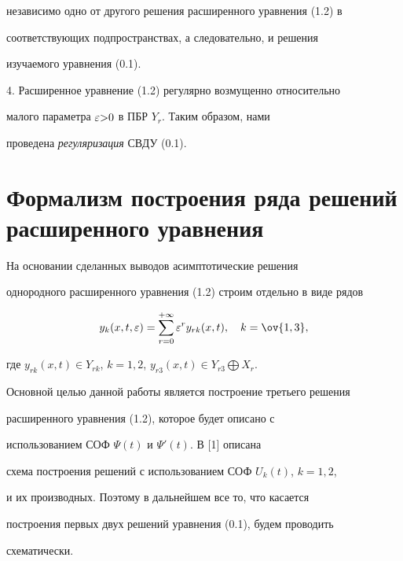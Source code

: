 независимо одно от другого решения расширенного уравнения (1.2) в


соответствующих подпространствах, а следовательно, и решения


изучаемого уравнения (0.1).





4. Расширенное уравнение (1.2) регулярно возмущенно относительно


малого параметра $\varepsilon{>}0$ в ПБР $Y_r$. Таким образом, нами


проведена {\it регуляризация} СВДУ (0.1).





\section{Формализм построения ряда решений расширенного уравнения}





На основании сделанных выводов асимптотические решения


однородного расширенного уравнения (1.2) строим отдельно в виде рядов


\begin{equation}


y_k (x, t, \e) = \sum \limits_{r=0}^{+\infty} \e^r y_{rk} (x,


t), \quad k =\ov{1,3},


\end{equation}


где $ y_{rk} (x,t) \in Y_{rk}$, $k=1,2$, $y_{r3} (x,t) \in


Y_{r3}\bigoplus X_r.$





Основной целью данной работы является построение третьего решения


расширенного уравнения (1.2), которое будет описано с


использованием СОФ $ \Psi (t) $ и $\Psi ' (t)$. В [1] описана


схема построения решений с использованием СОФ $ U_k (t)$, $k=1,2$,


и их производных. Поэтому в дальнейшем все то, что касается


построения первых двух решений уравнения (0.1), будем проводить


схематически.





